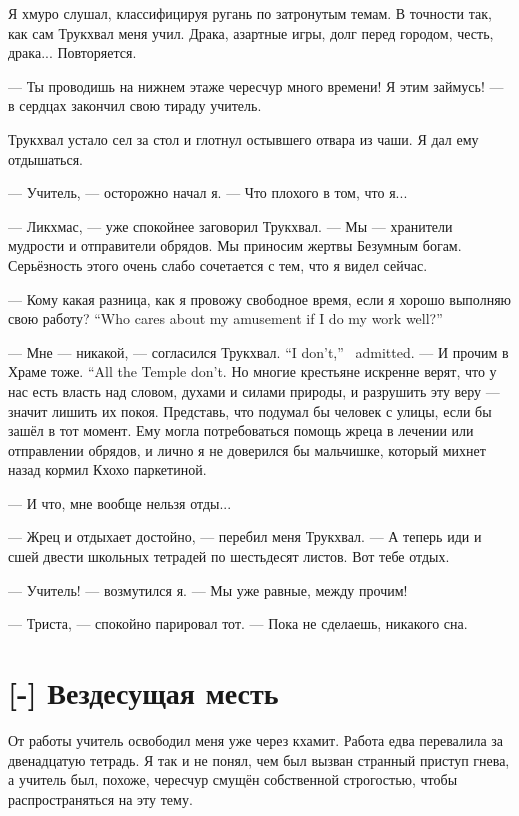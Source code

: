 Я хмуро слушал, классифицируя ругань по затронутым темам.
В точности так, как сам Трукхвал меня учил.
Драка, азартные игры, долг перед городом, честь, драка...
Повторяется.

--- Ты проводишь на нижнем этаже чересчур много времени!
Я этим займусь! --- в сердцах закончил свою тираду учитель.

Трукхвал устало сел за стол и глотнул остывшего отвара из чаши.
Я дал ему отдышаться.

--- Учитель, --- осторожно начал я.
--- Что плохого в том, что я...

--- Ликхмас, --- уже спокойнее заговорил Трукхвал.
--- Мы --- хранители мудрости и отправители обрядов.
Мы приносим жертвы Безумным богам.
Серьёзность этого очень слабо сочетается с тем, что я видел сейчас.

{--- Кому какая разница, как я провожу свободное время, если я хорошо выполняю свою работу?}
{``Who cares about my amusement if I do my work well?''}

{--- Мне --- никакой, --- согласился Трукхвал.}
{``I don't,'' \Trukchual\ admitted.}
{--- И прочим в Храме тоже.}
{``All the Temple don't.}
Но многие крестьяне искренне верят, что у нас есть власть над словом, духами и силами природы, и разрушить эту веру --- значит лишить их покоя.
Представь, что подумал бы человек с улицы, если бы зашёл в тот момент.
Ему могла потребоваться помощь жреца в лечении или отправлении обрядов, и лично я не доверился бы мальчишке, который михнет назад кормил Кхохо паркетиной.

--- И что, мне вообще нельзя отды...

--- Жрец и отдыхает достойно, --- перебил меня Трукхвал.
--- А теперь иди и сшей двести школьных тетрадей по шестьдесят листов.
Вот тебе отдых.

--- Учитель! --- возмутился я.
--- Мы уже равные, между прочим!

--- Триста, --- спокойно парировал тот.
--- Пока не сделаешь, никакого сна.

\section{[-] Вездесущая месть}

От работы учитель освободил меня уже через кхамит.
Работа едва перевалила за двенадцатую тетрадь.
Я так и не понял, чем был вызван странный приступ гнева, а учитель был, похоже, чересчур смущён собственной строгостью, чтобы распространяться на эту тему.

